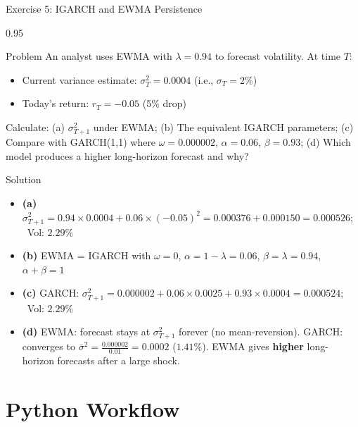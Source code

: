 \documentclass[9pt, aspectratio=169, t]{beamer}
\begin{document}
\begin{frame}{Exercise 5: IGARCH and EWMA Persistence}
    \begin{cminipage}{0.95\textwidth}
    {\footnotesize
    \begin{alertblock}{Problem}
        An analyst uses EWMA with $\lambda = 0.94$ to forecast volatility. At time $T$:
        \begin{itemize}\setlength{\itemsep}{0pt}
            \item Current variance estimate: $\sigma_T^2 = 0.0004$ (i.e., $\sigma_T = 2\%$)
            \item Today's return: $r_T = -0.05$ (5\% drop)
        \end{itemize}
        Calculate: (a) $\sigma_{T+1}^2$ under EWMA; (b) The equivalent IGARCH parameters; (c) Compare with GARCH(1,1) where $\omega = 0.000002$, $\alpha = 0.06$, $\beta = 0.93$; (d) Which model produces a higher long-horizon forecast and why?
    \end{alertblock}

    \vspace{0.1cm}
    \begin{exampleblock}{Solution}
        \begin{itemize}\setlength{\itemsep}{0pt}
            \item \textbf{(a)} $\sigma_{T+1}^2 = 0.94 \times 0.0004 + 0.06 \times (-0.05)^2 = 0.000376 + 0.000150 = 0.000526$; \ Vol: $2.29\%$
            \item \textbf{(b)} EWMA = IGARCH with $\omega = 0$, $\alpha = 1 - \lambda = 0.06$, $\beta = \lambda = 0.94$, \ $\alpha + \beta = 1$
            \item \textbf{(c)} GARCH: $\sigma_{T+1}^2 = 0.000002 + 0.06 \times 0.0025 + 0.93 \times 0.0004 = 0.000524$; \ Vol: $2.29\%$
            \item \textbf{(d)} EWMA: forecast stays at $\sigma_{T+1}^2$ forever (no mean-reversion). GARCH: converges to $\bar{\sigma}^2 = \frac{0.000002}{0.01} = 0.0002$ ($1.41\%$). EWMA gives \textbf{higher} long-horizon forecasts after a large shock.
        \end{itemize}
    \end{exampleblock}
    }
    \end{cminipage}
\end{frame}

\section{Python Workflow}
\end{document}
